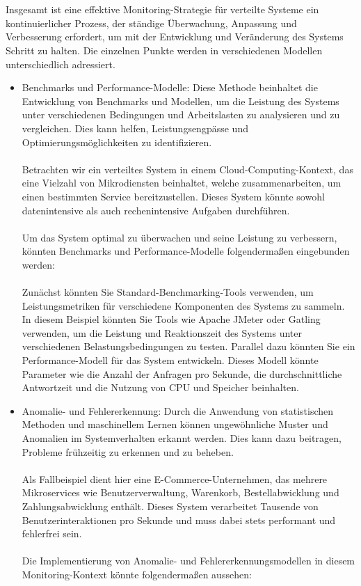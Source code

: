 \\\\
Insgesamt ist eine effektive Monitoring-Strategie für verteilte Systeme ein kontinuierlicher Prozess, der ständige Überwachung, Anpassung und Verbesserung erfordert, um mit der Entwicklung und Veränderung des Systems Schritt zu halten. Die einzelnen Punkte werden in verschiedenen Modellen unterschiedlich adressiert. 
\begin{itemize}
\item Benchmarks und Performance-Modelle: Diese Methode beinhaltet die Entwicklung von Benchmarks und Modellen, um die Leistung des Systems unter verschiedenen Bedingungen und Arbeitslasten zu analysieren und zu vergleichen. Dies kann helfen, Leistungsengpässe und Optimierungsmöglichkeiten zu identifizieren.
\\\\
Betrachten wir ein verteiltes System in einem Cloud-Computing-Kontext, das eine Vielzahl von Mikrodiensten beinhaltet, welche zusammenarbeiten, um einen bestimmten Service bereitzustellen. Dieses System könnte sowohl datenintensive als auch rechenintensive Aufgaben durchführen.
\\\\
Um das System optimal zu überwachen und seine Leistung zu verbessern, könnten Benchmarks und Performance-Modelle folgendermaßen eingebunden werden:
\\\\
Zunächst könnten Sie Standard-Benchmarking-Tools verwenden, um Leistungsmetriken für verschiedene Komponenten des Systems zu sammeln. In diesem Beispiel könnten Sie Tools wie Apache JMeter oder Gatling verwenden, um die Leistung und Reaktionszeit des Systems unter verschiedenen Belastungsbedingungen zu testen.
Parallel dazu könnten Sie ein Performance-Modell für das System entwickeln. Dieses Modell könnte Parameter wie die Anzahl der Anfragen pro Sekunde, die durchschnittliche Antwortzeit und die Nutzung von CPU und Speicher beinhalten.

\item Anomalie- und Fehlererkennung: Durch die Anwendung von statistischen Methoden und maschinellem Lernen können ungewöhnliche Muster und Anomalien im Systemverhalten erkannt werden. Dies kann dazu beitragen, Probleme frühzeitig zu erkennen und zu beheben.
\\\\
Als Fallbeispiel dient hier eine E-Commerce-Unternehmen, das mehrere Mikroservices wie Benutzerverwaltung, Warenkorb, Bestellabwicklung und Zahlungsabwicklung enthält. Dieses System verarbeitet Tausende von Benutzerinteraktionen pro Sekunde und muss dabei stets performant und fehlerfrei sein.
\\\\
Die Implementierung von Anomalie- und Fehlererkennungsmodellen in diesem Monitoring-Kontext könnte folgendermaßen aussehen:


\end{itemize}
